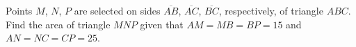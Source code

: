 Points $M$, $N$, $P$ are selected on sides $\overline{AB}$, $\overline{AC}$, $\overline{BC}$, respectively, of triangle $ABC$.  Find the area of triangle $MNP$ given that $AM=MB=BP=15$ and $AN=NC=CP=25$.
